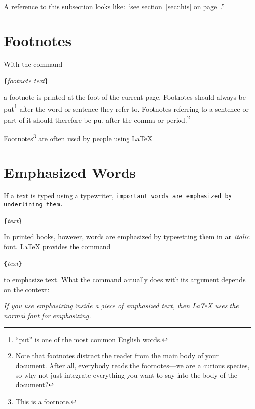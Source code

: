\begin{example}
A reference to this subsection
\label{sec:this} looks like:
``see section~\ref{sec:this} on 
page~\pageref{sec:this}.''
\end{example}
 
\section{Footnotes}
With the command
\begin{lscommand}
\verb|{|\emph{footnote text}\verb|}|
\end{lscommand}
\noindent a footnote is printed at the foot of the current page.  Footnotes
should always be put\footnote{``put'' is one of the most common
  English words.} after the word or sentence they refer to. Footnotes
referring to a sentence or part of it should therefore be put after
the comma or period.\footnote{Note that footnotes
  distract the reader from the main body of your document. After all,
  everybody reads the footnotes---we are a curious species, so why not
  just integrate everything you want to say into the body of the
  document?\footnotemark}

\begin{example}
Footnotes\footnote{This is 
  a footnote.} are often used 
by people using \LaTeX.
\end{example}
 
\section{Emphasized Words}

If a text is typed using a typewriter, \texttt{important words are
  emphasized by \underline{underlining} them.}
\begin{lscommand}
\verb|{|\emph{text}\verb|}|
\end{lscommand}
In printed books,
however, words are emphasized by typesetting them in an \emph{italic}
font.  \LaTeX{} provides the command
\begin{lscommand}
\verb|{|\emph{text}\verb|}|
\end{lscommand}
\noindent to emphasize text.  What the command actually does with 
its argument depends on the context:

\begin{example}
\emph{If you use 
  emphasizing inside a piece
  of emphasized text, then 
  \LaTeX{} uses the
  \emph{normal} font for 
  emphasizing.}
\end{example}

